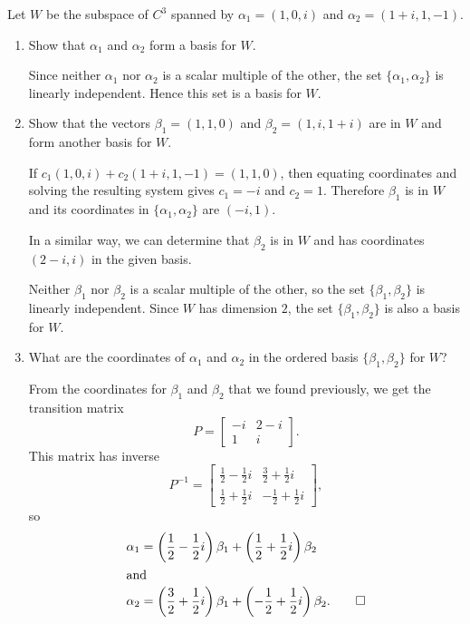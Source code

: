  Let $W$ be the subspace of $C^3$ spanned by
$\alpha_1 = (1,0,i)$ and $\alpha_2 = (1 + i, 1, -1)$.
\begin{enumerate}
\item Show that $\alpha_1$ and $\alpha_2$ form a basis for $W$.
  \begin{solution}
    Since neither $\alpha_1$ nor $\alpha_2$ is a scalar multiple of
    the other, the set $\{\alpha_1, \alpha_2\}$ is linearly
    independent. Hence this set is a basis for $W$.
  \end{solution}

\item Show that the vectors $\beta_1 = (1,1,0)$ and
  $\beta_2 = (1,i,1+i)$ are in $W$ and form another basis for $W$.
  \begin{solution}
    If $c_1(1,0,i) + c_2(1 + i, 1, -1) = (1, 1, 0)$, then equating
    coordinates and solving the resulting system gives $c_1 = -i$ and
    $c_2 = 1$. Therefore $\beta_1$ is in $W$ and its coordinates in
    $\{\alpha_1,\alpha_2\}$ are $(-i,1)$.

    In a similar way, we can determine that $\beta_2$ is in $W$ and
    has coordinates $(2-i,i)$ in the given basis.

    Neither $\beta_1$ nor $\beta_2$ is a scalar multiple of the other,
    so the set $\{\beta_1,\beta_2\}$ is linearly independent. Since
    $W$ has dimension $2$, the set $\{\beta_1,\beta_2\}$ is also a
    basis for $W$.
  \end{solution}

\item What are the coordinates of $\alpha_1$ and $\alpha_2$ in the
  ordered basis $\{\beta_1, \beta_2\}$ for $W$?
  \begin{solution}
    From the coordinates for $\beta_1$ and $\beta_2$ that we found
    previously, we get the transition matrix
    \begin{equation*}
      P =
      \begin{bmatrix}
        -i & 2 - i \\
        1 & i
      \end{bmatrix}.
    \end{equation*}
    This matrix has inverse
    \begin{equation*}
      P^{-1} =
      \begin{bmatrix}
        \frac12 - \frac12i & \frac32 + \frac12i \\[3pt]
        \frac12 + \frac12i & -\frac12 + \frac12i
      \end{bmatrix},
    \end{equation*}
    so
    \begin{align*}
      \alpha_1 &= \left(\frac12 - \frac12i\right)\beta_1
      + \left(\frac12 + \frac12i\right)\beta_2 \\
      \intertext{and}
      \alpha_2 &= \left(\frac32 + \frac12i\right)\beta_1
      + \left(-\frac12 + \frac12i\right)\beta_2. \qedhere
    \end{align*}
  \end{solution}
\end{enumerate}

